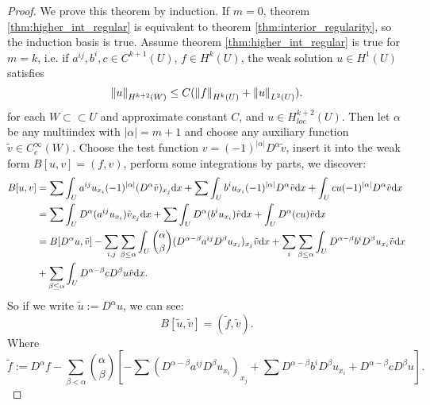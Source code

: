 \begin{proof}
    We prove this theorem by induction. If $m=0$, theorem \ref{thm:higher_int_regular} is equivalent to theorem \ref{thm:interior_regularity}, so the induction basis is true. Assume theorem \ref{thm:higher_int_regular} is true for $m=k$, i.e. if $a^{ij},b^{i},c\in C^{k+1}(U)$, $f\in H^{k}(U)$, the weak solution $u\in H^{1}(U)$ satisfies
    \begin{equation}
        \left\|u\right\|_{H^{k+2}(W)}\le C(\left\|f\right\|_{H^{k}(U)}+\left\|u\right\|_{L^{2}(U)}).
    \end{equation}
    for each $W\subset\subset U$ and approximate constant $C$, and $u\in H_{loc}^{k+2}(U)$. Then let $\alpha$ be any multiindex with $|\alpha|=m+1$ and choose any auxiliary function $\tilde{v}\in C_{c}^{\infty}(W)$. Choose the test function $v=(-1)^{|\alpha|}D^{\alpha}\tilde{v}$, insert it into the weak form $B[u,v]=(f,v)$, perform some integrations by parts, we discover:
    \begin{equation}
        \label{eq:Buv_int_by_part}
        \begin{aligned}
            B[u,v]&=\sum\int_{U}a^{ij}u_{x_{i}}(-1)^{|\alpha|}(D^{\alpha}\tilde{v})_{x_{j}}\mathrm{d} x+\sum\int_{U}b^{i}u_{x_{i}}(-1)^{|\alpha|}D^{\alpha}\tilde{v}\mathrm{d} x+\int_{U}cu(-1)^{|\alpha|}D^{\alpha}\tilde{v}\mathrm{d} x\\
            &=\sum\int_{U}D^{\alpha}(a^{ij}u_{x_{i}})\tilde{v}_{x_{j}}\mathrm{d} x+\sum\int_{U}D^{\alpha}(b^{i}u_{x_{i}})\tilde{v}\mathrm{d} x+\int_{U}D^{\alpha}(cu)\tilde{v}\mathrm{d} x\\
            &=B[D^{\alpha}u,\tilde{v}]-\sum_{i,j}\sum_{\beta\le\alpha}\int_{U}\binom{\alpha}{\beta}(D^{\alpha-\beta}a^{ij}D^{\beta}u_{x_{i}})_{x_{j}}\tilde{v}\mathrm{d} x+\sum_{i}\sum_{\beta\le\alpha}\int_{U}D^{\alpha-\beta}b^{i}D^{\beta}u_{x_{i}}\tilde{v}\mathrm{d} x\\
            &+\sum_{\beta\le\alpha}\int_{U}D^{\alpha-\beta}cD^{\beta}u\tilde{v}\mathrm{d} x.
        \end{aligned}
    \end{equation}
    So if we write $\tilde{u}:=D^{\alpha}u$, we can see:
    \begin{equation}
        B[\tilde{u},\tilde{v}]=(\tilde{f},\tilde{v}).
    \end{equation}
    Where 
    \begin{equation}
        \tilde{f}:=D^{\alpha}f-\sum_{\beta<\alpha}\binom{\alpha}{\beta}\left[-\sum(D^{\alpha-\beta}a^{ij}D^{\beta}u_{x_{i}})_{x_{j}}+\sum D^{\alpha-\beta}b^{i}D^{\beta}u_{x_{i}}+D^{\alpha-\beta}cD^{\beta}u\right].

\end{equation}
\end{proof}
